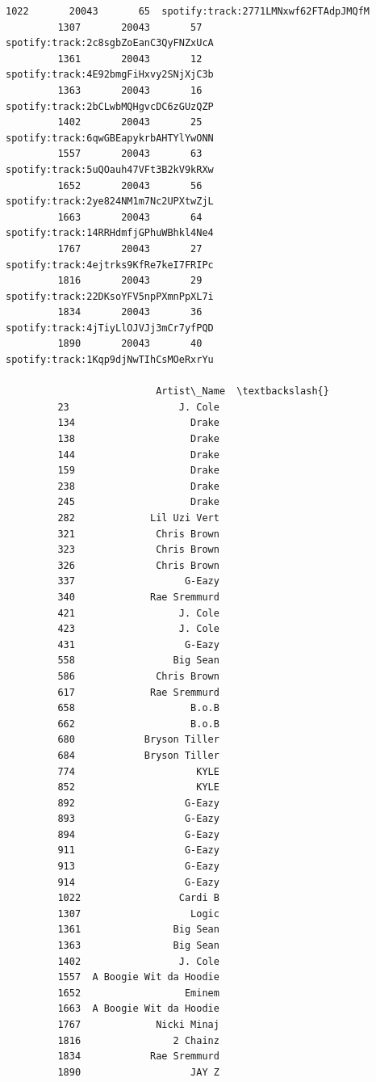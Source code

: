 \documentclass[11pt]{article}
\begin{document}
\begin{Verbatim}[commandchars=\\\{\}]
         1022       20043       65  spotify:track:2771LMNxwf62FTAdpJMQfM   
         1307       20043       57  spotify:track:2c8sgbZoEanC3QyFNZxUcA   
         1361       20043       12  spotify:track:4E92bmgFiHxvy2SNjXjC3b   
         1363       20043       16  spotify:track:2bCLwbMQHgvcDC6zGUzQZP   
         1402       20043       25  spotify:track:6qwGBEapykrbAHTYlYwONN   
         1557       20043       63  spotify:track:5uQOauh47VFt3B2kV9kRXw   
         1652       20043       56  spotify:track:2ye824NM1m7Nc2UPXtwZjL   
         1663       20043       64  spotify:track:14RRHdmfjGPhuWBhkl4Ne4   
         1767       20043       27  spotify:track:4ejtrks9KfRe7keI7FRIPc   
         1816       20043       29  spotify:track:22DKsoYFV5npPXmnPpXL7i   
         1834       20043       36  spotify:track:4jTiyLlOJVJj3mCr7yfPQD   
         1890       20043       40  spotify:track:1Kqp9djNwTIhCsMOeRxrYu   
         
                          Artist\_Name  \textbackslash{}
         23                   J. Cole   
         134                    Drake   
         138                    Drake   
         144                    Drake   
         159                    Drake   
         238                    Drake   
         245                    Drake   
         282             Lil Uzi Vert   
         321              Chris Brown   
         323              Chris Brown   
         326              Chris Brown   
         337                   G-Eazy   
         340             Rae Sremmurd   
         421                  J. Cole   
         423                  J. Cole   
         431                   G-Eazy   
         558                 Big Sean   
         586              Chris Brown   
         617             Rae Sremmurd   
         658                    B.o.B   
         662                    B.o.B   
         680            Bryson Tiller   
         684            Bryson Tiller   
         774                     KYLE   
         852                     KYLE   
         892                   G-Eazy   
         893                   G-Eazy   
         894                   G-Eazy   
         911                   G-Eazy   
         913                   G-Eazy   
         914                   G-Eazy   
         1022                 Cardi B   
         1307                   Logic   
         1361                Big Sean   
         1363                Big Sean   
         1402                 J. Cole   
         1557  A Boogie Wit da Hoodie   
         1652                  Eminem   
         1663  A Boogie Wit da Hoodie   
         1767             Nicki Minaj   
         1816                2 Chainz   
         1834            Rae Sremmurd   
         1890                   JAY Z   
         

\end{Verbatim}
\end{document}
